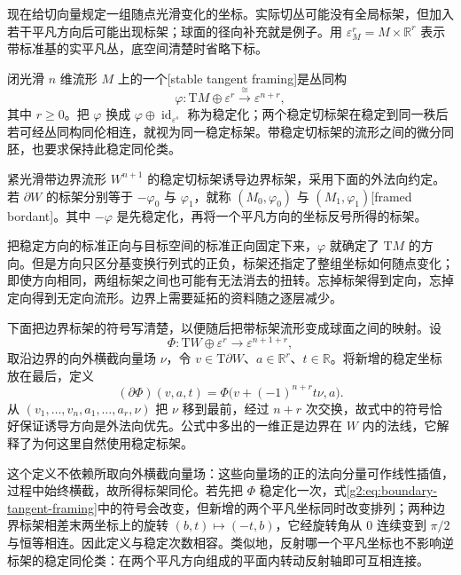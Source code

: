 现在给切向量规定一组随点光滑变化的坐标。实际切丛可能没有全局标架，但加入若干平凡方向后可能出现标架；球面的径向补充就是例子。用 \(\varepsilon_M^r=M\times\mathbb R^r\) 表示带标准基的实平凡丛，底空间清楚时省略下标。

\begin{definition}\label{g2:def:stable-framed-bordism}
	闭光滑 \(n\) 维流形 \(M\) 上的一个[stable tangent framing]是丛同构
	\[
		\varphi:\mathrm TM\oplus\varepsilon^r\xrightarrow{\ \cong\ }\varepsilon^{n+r},
	\]
	其中 \(r\ge0\)。把 \(\varphi\) 换成 \(\varphi\oplus\operatorname{id}_{\varepsilon^s}\) 称为稳定化；两个稳定切标架在稳定到同一秩后若可经丛同构同伦相连，就视为同一稳定标架。带稳定切标架的流形之间的微分同胚，也要求保持此稳定同伦类。

	紧光滑带边界流形 \(W^{n+1}\) 的稳定切标架诱导边界标架，采用下面的外法向约定。若 \(\partial W\) 的标架分别等于 \(-\varphi_0\) 与 \(\varphi_1\)，就称 \((M_0,\varphi_0)\) 与 \((M_1,\varphi_1)\)[framed bordant]。其中 \(-\varphi\) 是先稳定化，再将一个平凡方向的坐标反号所得的标架。
\end{definition}

把稳定方向的标准正向与目标空间的标准正向固定下来，\(\varphi\) 就确定了 \(\mathrm TM\) 的方向。但是方向只区分基变换行列式的正负，标架还指定了整组坐标如何随点变化；即使方向相同，两组标架之间也可能有无法消去的扭转。忘掉标架得到定向，忘掉定向得到无定向流形。边界上需要延拓的资料随之逐层减少。

下面把边界标架的符号写清楚，以便随后把带标架流形变成球面之间的映射。设
\[
	\Phi:\mathrm TW\oplus\varepsilon^r\longrightarrow\varepsilon^{n+1+r},
\]
取沿边界的向外横截向量场 \(\nu\)，令 \(v\in\mathrm T\partial W\)、\(a\in\mathbb R^r\)、\(t\in\mathbb R\)。将新增的稳定坐标放在最后，定义
\begin{equation}\label{g2:eq:boundary-tangent-framing}
	(\partial\Phi)(v,a,t)=\Phi\bigl(v+(-1)^{n+r}t\nu,a\bigr).
\end{equation}
从 \((v_1,\ldots,v_n,a_1,\ldots,a_r,\nu)\) 把 \(\nu\) 移到最前，经过 \(n+r\) 次交换，故式中的符号恰好保证诱导方向是外法向优先。公式中多出的一维正是边界在 \(W\) 内的法线，它解释了为何这里自然使用稳定标架。

这个定义不依赖所取向外横截向量场：这些向量场的正的法向分量可作线性插值，过程中始终横截，故所得标架同伦。若先把 \(\Phi\) 稳定化一次，式\eqref{g2:eq:boundary-tangent-framing}中的符号会改变，但新增的两个平凡坐标同时改变排列；两种边界标架相差末两坐标上的旋转 \((b,t)\mapsto(-t,b)\)，它经旋转角从 \(0\) 连续变到 \(\pi/2\) 与恒等相连。因此定义与稳定次数相容。类似地，反射哪一个平凡坐标也不影响逆标架的稳定同伦类：在两个平凡方向组成的平面内转动反射轴即可互相连接。

